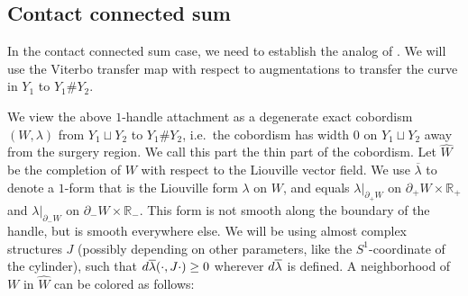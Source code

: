 \documentclass[reqno,11pt]{amsart}
\numberwithin{equation}{section}
\def\R{\mathbb{R}}
\def\rd{{\rm d}}
\begin{document}
\subsection{Contact connected sum}\label{ss:42}
In the contact connected sum case, we need to establish the analog of . We will use the Viterbo transfer map with respect to augmentations to transfer the curve in $Y_1$ to $Y_1\#Y_2$. 
\begin{figure}[H]
    \centering
\end{figure}
We view the above $1$-handle attachment as a degenerate exact cobordism $(W,\lambda)$ from $Y_1\sqcup Y_2$ to $Y_1\# Y_2$, i.e.\ the cobordism has width $0$ on $Y_1\sqcup Y_2$ away from the surgery region. We call this part the thin part of the cobordism. Let $\widehat{W}$ be the completion of $W$ with respect to the Liouville vector field. We use $\overline{\lambda}$ to denote a $1$-form that is the Liouville form $\lambda$ on $W$, and equals $\lambda|_{\partial_+W}$ on $\partial_+ W\times \R_+$ and $\lambda|_{\partial_-W}$ on $\partial_-W\times \R_-$. This form is not smooth along the boundary of the handle, but is smooth everywhere else. We will be using almost complex structures $J$ (possibly depending on other parameters, like the $S^1$-coordinate of the cylinder), such that $\rd \overline{\lambda} (\cdot,J\cdot)\ge 0$ wherever $\rd \overline{\lambda}$ is defined.  A neighborhood of $W$ in $\widehat{W}$ can be colored as follows:
\end{document}
